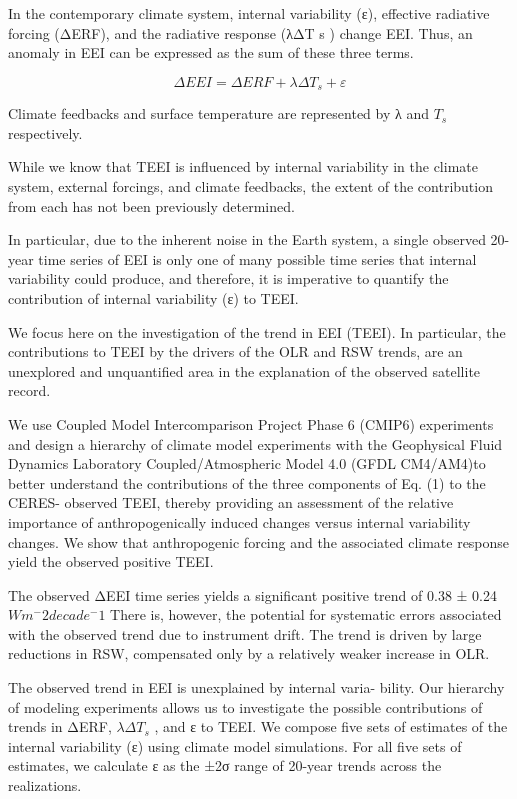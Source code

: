 \documentclass[
]{book}
\begin{document}
In the contemporary climate system, internal variability (ε),
effective radiative forcing (ΔERF), and the radiative response
(λΔT s ) change EEI. Thus, an anomaly in EEI can be
expressed as the sum of these three terms.

\[ΔEEI = ΔERF + λΔT_s+ ε\]

Climate feedbacks and surface temperature are represented by
λ and \(T_s\) respectively.

While we know
that TEEI is influenced by internal variability in the climate
system, external forcings, and climate feedbacks, the extent of the
contribution from each has not been previously determined.

In particular, due to the inherent noise in the Earth system, a
single observed 20-year time series of EEI is only one of many
possible time series that internal variability could produce,
and therefore, it is imperative to quantify the contribution of
internal variability (ε) to TEEI.

We focus here on the investigation of the trend in EEI (TEEI).
In particular, the contributions to TEEI by the drivers of the OLR
and RSW trends, are an unexplored and unquantified area in the
explanation of the observed satellite record.

We use Coupled
Model Intercomparison Project Phase 6 (CMIP6) experiments
and design a hierarchy of climate model experiments with the
Geophysical Fluid Dynamics Laboratory Coupled/Atmospheric
Model 4.0 (GFDL CM4/AM4)to better understand the
contributions of the three components of Eq. (1) to the CERES-
observed TEEI, thereby providing an assessment of the relative
importance of anthropogenically induced changes versus internal
variability changes. We show that anthropogenic forcing and the
associated climate response yield the observed positive TEEI.

The observed ΔEEI time series
yields a significant positive trend of 0.38 ± 0.24 \(Wm^-2 decade^-1\)
There is, however, the potential for systematic
errors associated with the observed trend due to instrument drift.
The trend is driven by large reductions in RSW,
compensated only by a relatively weaker increase in OLR.

The observed trend in EEI is unexplained by internal varia-
bility. Our hierarchy of modeling experiments allows us to
investigate the possible contributions of trends in ΔERF, \(λΔT_s\) ,
and ε to TEEI. We compose five sets of estimates of the internal
variability (ε) using climate model simulations. For all five sets of
estimates, we calculate ε as the ±2σ range of 20-year trends across
the realizations.
\end{document}
